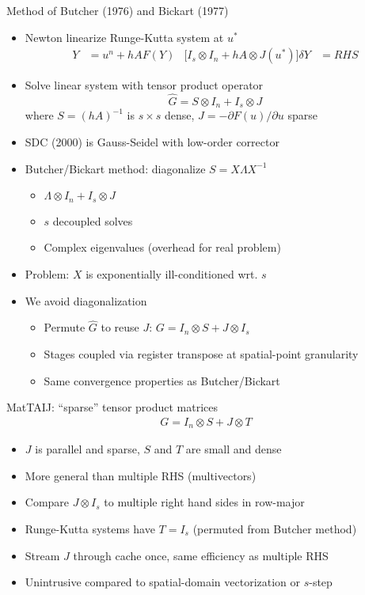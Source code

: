\documentclass{beamer}
\begin{document}
\begin{frame}{Method of Butcher (1976) and Bickart (1977)}
  \begin{itemize}
  \item Newton linearize Runge-Kutta system at $u^*$
    \begin{align*}
      Y &= u^{n} + h A F(Y) & \big[ I_s \otimes I_n + h A \otimes J(u^*)\big ] \delta Y &= RHS
    \end{align*}
  \item Solve linear system with tensor product operator
    \begin{equation*}
      \hat G = S \otimes I_n + I_s \otimes J
    \end{equation*}
    where $S = (hA)^{-1}$ is $s\times s$ dense, $J = -\partial F(u)/\partial u$ sparse
  \item SDC (2000) is Gauss-Seidel with low-order corrector
  \item Butcher/Bickart method: diagonalize $S = X \Lambda X^{-1}$
    \begin{itemize}
    \item $\Lambda \otimes I_n + I_s \otimes J$
    \item $s$ decoupled solves
    \item Complex eigenvalues (overhead for real problem)
    \end{itemize}
  \item Problem: $X$ is exponentially ill-conditioned wrt. $s$
  \item We avoid diagonalization
    \begin{itemize}
    \item Permute $\hat G$ to reuse $J$: $G = I_n \otimes S + J \otimes I_s$
    \item Stages coupled via register transpose at spatial-point granularity
    \item Same convergence properties as Butcher/Bickart
    \end{itemize}
  \end{itemize}
\end{frame}

\begin{frame}{MatTAIJ: ``sparse'' tensor product matrices}
  \begin{gather*}
    G = I_n \otimes S + J \otimes T
  \end{gather*}
  \begin{itemize}
  \item $J$ is parallel and sparse, $S$ and $T$ are small and dense
  \item More general than multiple RHS (multivectors)
  \item Compare $J \otimes I_s$ to multiple right hand sides in row-major
  \item Runge-Kutta systems have $T = I_s$ (permuted from Butcher method)
  \item Stream $J$ through cache once, same efficiency as multiple RHS
  \item Unintrusive compared to spatial-domain vectorization or $s$-step
  \end{itemize}
\end{frame}
\end{document}
